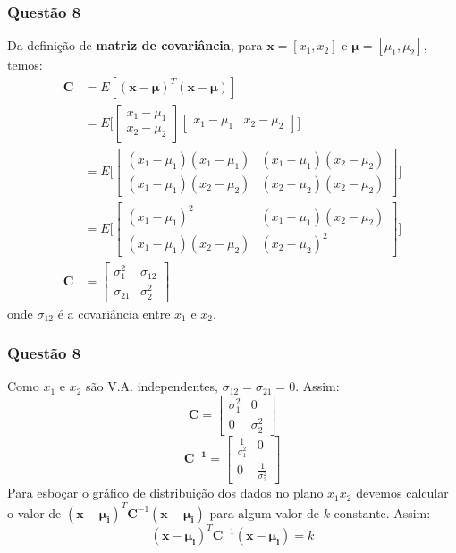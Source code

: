 \documentclass{beamer}\usepackage[]{graphicx}\usepackage[]{color}
\begin{document}
		\begin{frame}
			\frametitle{Questão 8}
			Da definição de \textbf{matriz de covariância}, para $\boldsymbol{x} = [x_{1}, x_{2}]$ e $\boldsymbol{\mu} = [\mu_{1}, \mu_{2}]$, temos:
			\begin{align*}
				\boldsymbol{C} &= E[(\boldsymbol{x} - \boldsymbol{\mu})^{T}(\boldsymbol{x} - \boldsymbol{\mu})]\\
				&= E\bigg[\begin{bmatrix}
					x_{1} - \mu_{1} \\ x_{2} - \mu_{2}
				\end{bmatrix}
				\begin{bmatrix}
					x_{1} - \mu_{1} & x_{2} - \mu_{2}
				\end{bmatrix}\bigg]\\
				&= E\bigg[\begin{bmatrix}
					(x_{1} - \mu_{1})(x_{1} - \mu_{1})&(x_{1} - \mu_{1})(x_{2} - \mu_{2})\\(x_{1} - \mu_{1})(x_{2} - \mu_{2})&(x_{2} - \mu_{2})(x_{2} - \mu_{2})
				\end{bmatrix}
				\bigg]\\
				&= E\bigg[\begin{bmatrix}
				(x_{1} - \mu_{1})^{2}&(x_{1} - \mu_{1})(x_{2} - \mu_{2})\\(x_{1} - \mu_{1})(x_{2} - \mu_{2})&(x_{2} - \mu_{2})^{2}
				\end{bmatrix}
				\bigg]\\
				\boldsymbol{C} &= \begin{bmatrix}
					\sigma_{1}^{2}&\sigma_{12}\\
					\sigma_{21}&\sigma_{2}^{2}
				\end{bmatrix}
			\end{align*}
			onde $\sigma_{12}$ é a covariância entre $x_{1}$ e $x_{2}$.
		\end{frame}
		
		\begin{frame}
			\frametitle{Questão 8}
			Como $x_{1}$ e $x_{2}$ são V.A. independentes, $\sigma_{12} = \sigma_{21} = 0$.  Assim:
			$$\boldsymbol{C} = \begin{bmatrix}
				\sigma_{1}^{2}&0\\0&\sigma_{2}^{2}
			\end{bmatrix}$$
			$$\boldsymbol{C^{-1}} =
			\begin{bmatrix}
				\frac{1}{\sigma_{1}^{2}}&0\\0&\frac{1}{\sigma_{2}^{2}}
			\end{bmatrix}$$
			Para esboçar o gráfico de distribuição dos dados no plano $x_{1}x_{2}$ devemos calcular o valor de $(\boldsymbol{x} - \boldsymbol{\mu_{i}})^{T}\boldsymbol{C}^{-1}(\boldsymbol{x} - \boldsymbol{\mu_{i}})$ para algum valor de $k$ constante.  Assim:$$(\boldsymbol{x} - \boldsymbol{\mu_{i}})^{T}\boldsymbol{C}^{-1}(\boldsymbol{x} - \boldsymbol{\mu_{i}}) = k$$
		\end{frame}
	
\end{document}
